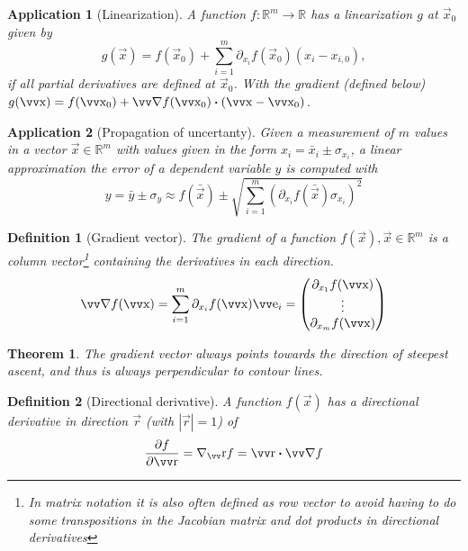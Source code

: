 \documentclass[twocolumn, margin=normal]{tex/hsrzf}
\theoremstyle{fuvarzf}
\newtheorem{theorem}{Theorem}
\newtheorem{application}{Application}
\newtheorem{definition}{Definition}
\begin{document}
\begin{application}[Linearization]
  A function \(f: \mathbb{R}^m\to\mathbb{R}\) has a linearization \(g\) at
  \(\vec{x}_0\) given by
  \[
    g(\vec{x}) = f(\vec{x}_0) 
      + \sum_{i=1}^m \partial_{x_i} f(\vec{x}_0)(x_i - x_{i,0}) ,
  \]
  if all partial derivatives are defined at \(\vec{x}_0\). With the gradient
  (defined below) \(g(\vec{x}) = f(\vec{x}_0) + \grad f(\vec{x}_0) \dotp
  (\vec{x} - \vec{x}_0)\).
\end{application}

\begin{application}[Propagation of uncertanty]
  Given a measurement of \(m\) values in a vector \(\vec{x}\in\mathbb{R}^m\)
  with values given in the form \(x_i = \bar{x}_i \pm \sigma_{x_i}\), a linear
  approximation the error of a dependent variable \(y\) is computed with
  \[
    y = \bar{y} \pm \sigma_y \approx f(\bar{\vec{x}})
      \pm \sqrt{\sum_{i=1}^m \left(
        \partial_{x_i} f(\bar{\vec{x}}) \sigma_{x_i}\right)^2}
  \]
\end{application}

\begin{definition}[Gradient vector]
  The \emph{gradient} of a function \(f(\vec{x}), \vec{x}\in\mathbb{R}^m\) is a
  column vector\footnote{In matrix notation it is also often defined as row
  vector to avoid having to do some transpositions in the Jacobian matrix and
  dot products in directional derivatives} containing the derivatives in each
  direction.
  \[
    \grad f (\vec{x}) = \sum_{i=1}^m \partial_{x_i} f(\vec{x}) \vec{e}_i
      = \begin{pmatrix}
        \partial_{x_1} f(\vec{x}) \\
        \vdots \\
        \partial_{x_m} f(\vec{x}) \\
      \end{pmatrix}
  \]
\end{definition}

\begin{theorem}
  The gradient vector always points towards \emph{the direction of steepest
  ascent}, and thus is always perpendicular to contour lines.
\end{theorem}

\begin{definition}[Directional derivative]
  A function \(f(\vec{x})\) has a directional derivative in direction
  \(\vec{r}\) (with \(|\vec{r}|=1\)) of
  \[
    \frac{\partial f}{\partial\vec{r}} 
      = \nabla_\vec{r} f = \vec{r} \dotp \grad f
  \]
\end{definition}
\end{document}
